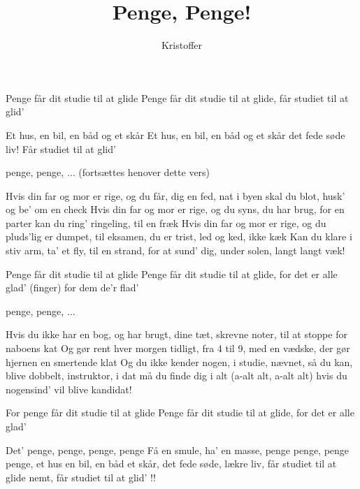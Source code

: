 \documentclass[a4paper,11pt]{article}
\title{Penge, Penge!}
\author{Kristoffer}
\begin{document}
\maketitle

\begin{song}
Penge får  dit studie til at glide  
Penge får dit studie til at glide, får studiet til at glid'

\bigskip

Et hus, en bil,  en båd og et skår  
Et hus, en bil, en båd og et skår det fede søde liv! Får studiet
til at glid' 

\bigskip

penge, penge, $\ldots$ (fortsættes henover dette vers)

Hvis din far og mor er rige, og du får, dig en fed, nat i byen skal
du blot, husk' og be' om en check  
Hvis din far og mor er rige, og du syns, du har brug, for en parter
kan du ring' ringeling, til en fræk 
Hvis din far og mor er rige, og du pluds'lig er dumpet, til eksamen, du
er trist, led og ked, ikke kæk 
Kan du klare i stiv arm, ta' et fly, til en strand, for at sund' dig,
under solen, langt langt væk! 

\bigskip

Penge får  dit studie til at glide  
Penge får dit studie til at glide, for det er alle glad' (finger) for
dem de'r flad' 

\bigskip

penge, penge, $\ldots$

Hvis du ikke har en bog, og har brugt, dine tæt, skrevne noter, til
at stoppe for naboens kat 
Og gør rent hver morgen tidligt, fra 4 til 9, med en vædske, der
gør hjernen en smertende klat 
Og du ikke kender nogen, i studie, nævnet, så du kan, blive dobbelt,
instruktor, i dat 
må du finde dig i alt (a-alt alt, a-alt alt) hvis du nogensind' vil
blive kandidat! 

\bigskip

For penge får  dit studie til at glide  
Penge får dit studie til at glide, for det er alle glad'

\bigskip

Det'  penge, penge, penge, penge  
Få en smule, ha' en masse, penge penge, penge penge, 
et hus en bil, en båd et skår, det fede søde, lækre liv, 
får studiet til at glide nemt, får studiet til at glid' !!

\end{song}
\end{document}
